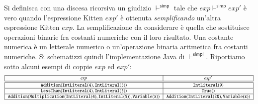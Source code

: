 \begin{exercise}\label{ex:expressions_simplify}
Si definisca con una discesa ricorsiva un giudizio
$\vdash^{\mathsf{simp}}$ tale che
$\mathit{exp}\vdash^{\mathsf{simp}}\mathit{exp}'$ \`e vero quando
l'espressione Kitten $\mathit{exp}'$ \`e ottenuta \emph{semplificando}
un'altra espressione Kitten $\mathit{exp}$. La semplificazione da considerare
\`e quella che sostituisce operazioni binarie fra costanti numeriche
con il loro risultato. Una costante numerica \`e un letterale numerico
o un'operazione binaria aritmetica fra costanti numeriche.
Si schematizzi quindi l'implementazione Java di $\vdash^{\mathsf{simpl}}$.
Riportiamo sotto alcuni esempi di coppie $\mathit{exp}$ ed $\mathit{exp}'$:
%
\[
{\scriptsize
\begin{array}{|c|c|}\hline
  \mathit{exp} & \mathit{exp'}\\\hline\hline
  \mathtt{Addition(IntLiteral(4),IntLiteral(5))} & \mathtt{IntLiteral(9)} \\
    \hline
  \mathtt{LessThan(IntLiteral(4),IntLiteral(5))} & \mathtt{True()} \\\hline
  \mathtt{Addition(Multiplication(IntLiteral(4),IntLiteral(5)),
    Variable(x))} & \mathtt{Addition(IntLiteral(20),Variable(x))}\\\hline
\end{array}
}
\]
\end{exercise}
